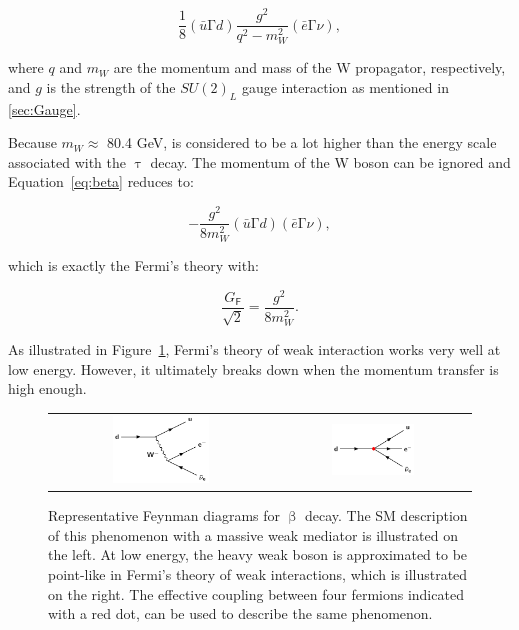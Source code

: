 \begin{equation}
\label{eq:beta}
\frac{1}{8}(\bar{u}\mathrm{\Gamma}d)\frac{g^2}{q^2-m_{W}^2}(\bar{e}\mathrm{\Gamma}\nu),
\end{equation}

where $q$ and $m_W$ are the momentum and mass of the W propagator, respectively, and $g$ is the strength of the $SU(2)_{L}$ gauge interaction as mentioned in \autoref{sec:Gauge}.

Because $m_W\approx$ 80.4 GeV, is considered to be a lot higher than the energy scale associated with the $\uptau$ decay. The momentum of the W boson can be ignored and Equation~\ref{eq:beta} reduces to:

\begin{equation}
\label{eq:beta}
-\frac{g^2}{8m_{W}^2}(\bar{u}\mathrm{\Gamma}d)(\bar{e}\mathrm{\Gamma}\nu),
\end{equation}

which is exactly the Fermi's theory with:

\begin{equation}
\frac{G_{\textsf{F}}}{\sqrt{2}}=\frac{g^2}{8m_{W}^2}.
\end{equation}

As illustrated in Figure~\ref{fig:FermiEFT}, Fermi's theory of weak interaction works very well at low energy. However, it ultimately breaks down when the momentum transfer is high enough. 

\begin{figure}[tbh!]
 \begin{center}
 \begin{tabular}{cc}
 \includegraphics[width=0.45\textwidth]{figures/Part1/EFT/BetaDecay}&
 \includegraphics[width=0.45\textwidth]{figures/Part1/EFT/FermiTheory}\\
 \end{tabular}
 \caption{Representative Feynman diagrams for $\upbeta$ decay. The \ac{SM} description of this phenomenon with a massive weak mediator is illustrated on the left. At low energy, the heavy weak boson is approximated to be point-like in Fermi's theory of weak interactions, which is illustrated on the right. The effective coupling between four fermions indicated with a red dot, can be used to describe the same phenomenon.}
 \label{fig:FermiEFT}
 \end{center}
\end{figure}

